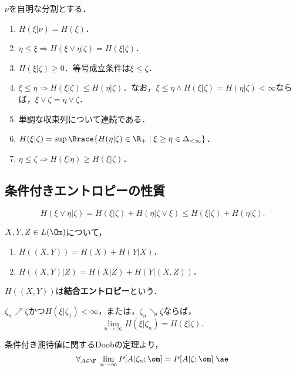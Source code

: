 \documentclass[uplatex,dvipdfmx]{jsreport}
\begin{document}
\begin{proposition}
    $\nu$を自明な分割とする．
    \begin{enumerate}
        \item $H(\xi|\nu)=H(\xi)$．
        \item $\eta\le\xi\Rightarrow H(\xi\lor\eta|\zeta)=H(\xi|\zeta)$．
        \item $H(\xi|\zeta)\ge0$．等号成立条件は$\xi\le\zeta$．
        \item $\xi\le\eta\Rightarrow H(\xi|\zeta)\le H(\eta|\zeta)$．なお，$\xi\le\eta\land H(\xi|\zeta)=H(\eta|\zeta)<\infty$ならば，$\xi\lor\zeta=\eta\lor\zeta$．
        \item 単調な収束列について連続である．
        \item $H(\xi|\zeta)=\sup\Brace{H(\eta|\zeta)\in\R_+\mid\xi\ge\eta\in\Delta_{<\infty}}$．
        \item $\eta\le\zeta\Rightarrow H(\xi|\eta)\ge H(\xi|\zeta)$．
    \end{enumerate}
\end{proposition}

\subsection{条件付きエントロピーの性質}

\begin{proposition}[連鎖律と三角不等式]
    \[H(\xi\lor\eta|\zeta)=H(\xi|\zeta)+H(\eta|\zeta\lor\xi)\le H(\xi|\zeta)+H(\eta|\zeta).\]
\end{proposition}
\begin{corollary}[確率変数の場合]
    $X,Y,Z\in L(\Om)$について，
    \begin{enumerate}
        \item $H((X,Y))=H(X)+H(Y|X)$．
        \item $H((X,Y)|Z)=H(X|Z)+H(Y|(X,Z))$．
    \end{enumerate}
\end{corollary}
\begin{remarks}
    $H((X,Y))$は\textbf{結合エントロピー}という．

\end{remarks}

\begin{proposition}
    $\zeta_n\nearrow\zeta$かつ$H(\xi|\zeta_1)<\infty$，または，$\zeta_n\searrow\zeta$ならば，
    \[\lim_{n\to\infty}H(\xi|\zeta_n)=H(\xi|\zeta).\]
\end{proposition}
\begin{Proof}
    条件付き期待値に関するDoobの定理より，
    \[\forall_{A\in\F}\;\lim_{n\to\infty}P[A|\zeta_n;\om]=P[A|\zeta;\om]\;\ae\]
\end{Proof}
\end{document}
